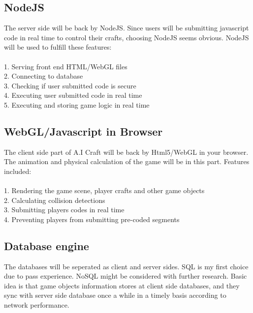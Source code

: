 \documentclass[12pt]{article}
\begin{document}
\subsection{NodeJS}
The server side will be back by NodeJS. Since users will be submitting javascript code in real time to control their crafts, choosing NodeJS seems obvious. NodeJS will be used to fulfill these features:\\
\\
1. Serving front end HTML/WebGL files\\
2. Connecting to database\\
3. Checking if user submitted code is secure\\
4. Executing user submitted code in real time\\
5. Executing and storing game logic in real time\\

\subsection{WebGL/Javascript in Browser}
The client side part of A.I Craft will be back by Html5/WebGL in your browser.
The animation and physical calculation of the game will be in this part. Features included:\\
\\
1. Rendering the game scene, player crafts and other game objects\\
2. Calculating collision detections\\
3. Submitting players codes in real time\\
4. Preventing players from submitting pre-coded segments\\

\subsection{Database engine}
The databases will be seperated as client and server sides. SQL is my first choice due to pass experience. NoSQL might be considered with further research. Basic idea is that game objects information stores at client side databases, and they sync with server side database once a while in a timely basis according to network performance.
\end{document}
